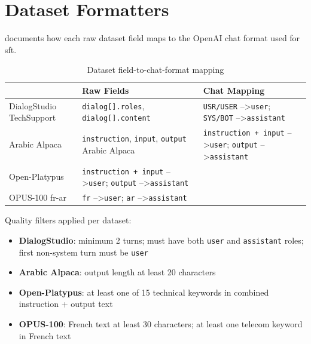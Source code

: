\section{Dataset Formatters}
\label{app:dataset-formatters}

 documents how each raw dataset field
maps to the OpenAI chat format used for \acrshort{sft}.

\begin{table}[htbp]
  \centering
  \caption{Dataset field-to-chat-format mapping}
  \label{tab:formatter-mapping}
  \begin{tabularx}{\textwidth}{lXX}
    \toprule
    \tableheader{Dataset & Raw Fields & Chat Mapping} \\
    \midrule
    DialogStudio TechSupport
      & \texttt{dialog[].roles}, \texttt{dialog[].content}
      & \texttt{USR/USER} --\textgreater \texttt{user};
        \texttt{SYS/BOT} --\textgreater \texttt{assistant} \\
    \rowcolor{TableRowOdd}
    Arabic Alpaca
      & \texttt{instruction}, \texttt{input}, \texttt{output}
      Arabic Alpaca
        & \texttt{instruction + input} --\textgreater \texttt{user};
          \texttt{output} --\textgreater \texttt{assistant} \\
      Open-Platypus
        & \texttt{instruction + input} --\textgreater \texttt{user};
          \texttt{output} --\textgreater \texttt{assistant} \\
      \rowcolor{TableRowOdd}
      OPUS-100 fr-ar
        & \texttt{fr} --\textgreater \texttt{user};
          \texttt{ar} --\textgreater \texttt{assistant} \\
      \bottomrule
      \end{tabularx}
      \end{table}

      Quality filters applied per dataset:
      \begin{itemize}
      \item \textbf{DialogStudio}: minimum 2 turns; must have both
          \texttt{user} and \texttt{assistant} roles; first non-system
          turn must be \texttt{user}
      \item \textbf{Arabic Alpaca}: output length at least 20 characters
      \item \textbf{Open-Platypus}: at least one of 15 technical
          keywords in combined instruction + output text
      \item \textbf{OPUS-100}: French text at least 30 characters;
          at least one telecom keyword in French text
      \end{itemize}

